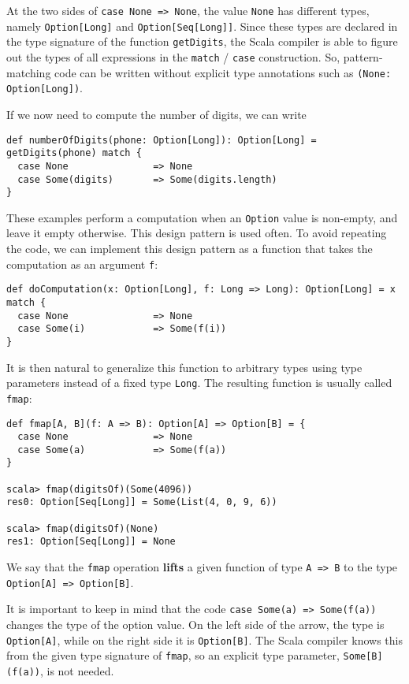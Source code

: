 At the two sides of \lstinline!case None => None!, the value \lstinline!None!
has different types, namely \lstinline!Option[Long]! and \lstinline!Option[Seq[Long]]!.
Since these types are declared in the type signature of the function
\lstinline!getDigits!, the Scala compiler is able to figure out the
types of all expressions in the \lstinline!match! / \lstinline!case!
construction. So, pattern-matching code can be written without explicit
type annotations such as \lstinline!(None: Option[Long])!.

If we now need to compute the number of digits, we can write
\begin{lstlisting}
def numberOfDigits(phone: Option[Long]): Option[Long] = getDigits(phone) match {
  case None               => None
  case Some(digits)       => Some(digits.length)
}
\end{lstlisting}

These examples perform a computation when an \lstinline!Option! value
is non-empty, and leave it empty otherwise. This design pattern is
used often. To avoid repeating the code, we can implement this design
pattern as a function that takes the computation as an argument \lstinline!f!:
\begin{lstlisting}
def doComputation(x: Option[Long], f: Long => Long): Option[Long] = x match {
  case None               => None
  case Some(i)            => Some(f(i))
}
\end{lstlisting}
It is then natural to generalize this function to arbitrary types
using type parameters instead of a fixed type \lstinline!Long!. The
resulting function is usually called \lstinline!fmap!:
\begin{lstlisting}
def fmap[A, B](f: A => B): Option[A] => Option[B] = {
  case None               => None
  case Some(a)            => Some(f(a))
}

scala> fmap(digitsOf)(Some(4096))
res0: Option[Seq[Long]] = Some(List(4, 0, 9, 6))

scala> fmap(digitsOf)(None)
res1: Option[Seq[Long]] = None
\end{lstlisting}
We say that the \lstinline!fmap! operation \textbf{lifts}
a given function of type \lstinline!A => B! to the type \lstinline!Option[A] => Option[B]!. 

It is important to keep in mind that the code \lstinline!case Some(a) => Some(f(a))!
changes the type of the option value. On the left side of the arrow,
the type is \lstinline!Option[A]!, while on the right side it is
\lstinline!Option[B]!. The Scala compiler knows this from the given
type signature of \lstinline!fmap!, so an explicit type parameter,
\lstinline!Some[B](f(a))!, is not needed.

